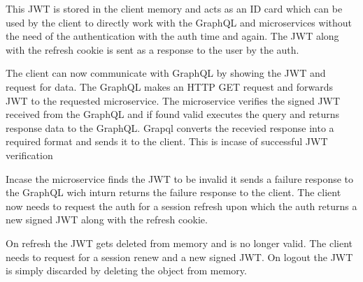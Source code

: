 This JWT is stored in the client memory and acts as an ID card which can be used by 
the client to directly work with the GraphQL and microservices without the need of 
the authentication with the auth time and again.
The JWT along with the refresh cookie is sent as a response to the user by the auth.

The client can now communicate with GraphQL by showing the JWT and request for data.
The GraphQL makes an HTTP GET request and forwards JWT to the requested microservice.
The microservice verifies the signed JWT received from the GraphQL and if found valid 
executes the query and returns response data to the GraphQL.
Grapql converts the recevied response into a required format and sends it to the client.
This is incase of successful JWT verification

Incase the microservice finds the JWT to be invalid it sends a failure response to the 
GraphQL wich inturn returns the failure response to the client.
The client now needs to request the auth for a session refresh upon which the auth 
returns a new signed JWT along with the refresh cookie.

On refresh the JWT gets deleted from memory and is no longer valid. The client needs 
to request for a session renew and a new signed JWT.
On logout the JWT is simply discarded by deleting the object from memory. 

